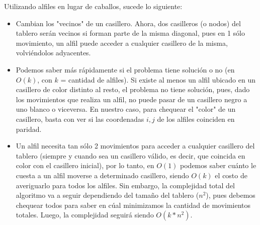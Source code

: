 Utilizando alfiles en lugar de caballos, sucede lo siguiente: 

\begin{itemize}
        \item Cambian los "vecinos" de un casillero. Ahora, dos casilleros (o nodos) del tablero
        serán vecinos si forman parte de la misma diagonal, pues en 1 sólo movimiento, un alfil
        puede acceder a cualquier casillero de la misma, volviéndolos adyacentes.

        \item Podemos saber más rápidamente si el problema tiene solución o no (en $O(k)$, 
        con $k$ = cantidad de alfiles). Si existe al menos un alfil ubicado en un casillero de color   
        distinto al resto, el problema no tiene solución, pues, dado los movimientos que realiza un 
        alfil, no puede pasar de un casillero negro a uno blanco o viceversa. En nuestro caso, para 
        chequear el "color" de un casillero, basta con ver si las coordenadas $i, j$ de los alfiles 
        coinciden en paridad.

        \item Un alfil necesita tan sólo 2 movimientos para acceder a cualquier casillero del 
        tablero (siempre y cuando sea un casillero válido, es decir, que coincida en color con 
        el casillero inicial), por lo tanto, en $O(1)$ podemos saber cuánto le cuesta a un
        alfil moverse a determinado casillero, siendo $O(k)$ el costo de averiguarlo para todos los    
        alfiles. Sin embargo, la complejidad total del algoritmo va a seguir dependiendo del tamaño del 
        tablero ($n^2$), pues debemos chequear todos para saber en cúal minimizamos la cantidad de       
        movimientos totales. Luego, la complejidad seguirá siendo $O(k*n^2)$.
\end{itemize}
